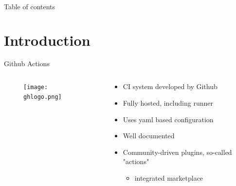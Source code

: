 \documentclass[compress,aspectratio=169]{beamer}
\begin{document}
	\begin{frame}[plain]
		\titlepage
	\end{frame}

	\begin{frame}[t]{Table of contents}
		\tableofcontents[subsectionstyle=hide/hide]
	\end{frame}


	\section{Introduction}

	\begin{frame}{Github Actions}
    \begin{columns}
      \begin{column}{0.5\textwidth}
        \begin{figure}
          \begin{center}
            \texttt{[image: ghlogo.png]}
          \end{center}
        \end{figure}
      \end{column}
      \begin{column}{0.5\textwidth}
        \begin{itemize}
          \item CI system developed by Github
          \item Fully hosted, including runner
          \item Uses yaml based configuration
          \item Well documented
          \item Community-driven plugins, so-called "actions"
            \begin{itemize}
              \item integrated marketplace
            \end{itemize}
        \end{itemize}
      \end{column}
    \end{columns}
	\end{frame}
\end{document}
